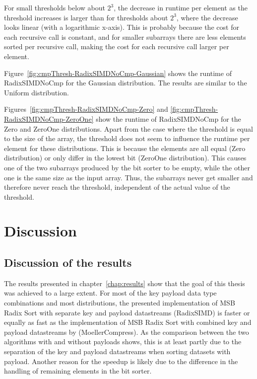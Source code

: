 \documentclass[12pt, a4paper, openright, twoside]{tiarbeit}
\begin{document}
For small thresholds below about $2^3$, the decrease in runtime per element as the threshold
increases is larger than for thresholds about $2^3$, where the decrease looks
linear (with a logarithmic x-axis).
This is probably because the cost for each recursive call is constant,
and for smaller subarrays there are less elements sorted per recursive
call, making the cost for each recursive call larger per element.



Figure~\ref{fig:cmpThresh-RadixSIMDNoCmp-Gaussian} shows the runtime of RadixSIMDNoCmp
for the Gaussian distribution. The results are similar to the Uniform distribution.


Figures~\ref{fig:cmpThresh-RadixSIMDNoCmp-Zero} and
\ref{fig:cmpThresh-RadixSIMDNoCmp-ZeroOne} show the runtime of RadixSIMDNoCmp
for the Zero and ZeroOne distributions. Apart from the case where
the threshold is equal to the size of the array,
the threshold does not seem to influence the runtime per element
for these distributions.
This is because the elements are all equal (Zero distribution)
or only differ in the lowest bit (ZeroOne distribution).
This causes one of the two subarrays produced by the bit sorter to be empty,
while the other one is the same size as the input array.
Thus, the subarrays never get smaller and therefore never reach
the threshold, independent of the actual value of the threshold.


\chapter{Discussion}

\section{Discussion of the results}

The results presented in chapter~\ref{chap:results} show that the goal of this
thesis was achieved to a large extent.
For most of the key payload data type combinations and most distributions,
the presented implementation of MSB Radix Sort with separate key and payload
datastreams (RadixSIMD) is faster or equally as fast as the
implementation of MSB Radix Sort with combined key and payload
datastreams by \citet{moeller_radix} (MoellerCompress).
As the comparison between the two algorithms with and without payloads shows,
this is at least partly due to the separation of the key and payload
datastreams when sorting datasets with payload.
Another reason for the speedup is likely due to the difference
in the handling of remaining elements in the bit sorter.
\end{document}
